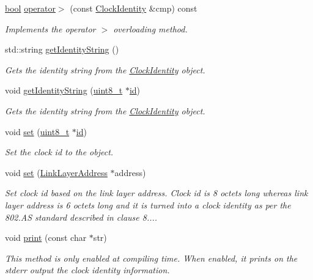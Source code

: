 \begin{DoxyCompactItemize}
\hyperlink{avb__gptp_8h_af6a258d8f3ee5206d682d799316314b1}{bool} \hyperlink{class_clock_identity_ae0b3cf69f8690ec06af628ca2caa7ada}{operator$>$} (const \hyperlink{class_clock_identity}{Clock\+Identity} \&cmp) const 
\begin{DoxyCompactList}\small\item\em Implements the operator \textquotesingle{}$>$\textquotesingle{} overloading method. \end{DoxyCompactList}\item 
std\+::string \hyperlink{class_clock_identity_a340cfc06879a22b087f117121c347b56}{get\+Identity\+String} ()
\begin{DoxyCompactList}\small\item\em Gets the identity string from the \hyperlink{class_clock_identity}{Clock\+Identity} object. \end{DoxyCompactList}\item 
void \hyperlink{class_clock_identity_a944c6cf067934cf2caed1e93c367a852}{get\+Identity\+String} (\hyperlink{stdint_8h_aba7bc1797add20fe3efdf37ced1182c5}{uint8\+\_\+t} $\ast$\hyperlink{class_clock_identity_a8898dbdfcac5107567fdbf4878c140f9}{id})
\begin{DoxyCompactList}\small\item\em Gets the identity string from the \hyperlink{class_clock_identity}{Clock\+Identity} object. \end{DoxyCompactList}\item 
void \hyperlink{class_clock_identity_ab72d8e8d5a8c02e4c3a3ddcb272e7f4c}{set} (\hyperlink{stdint_8h_aba7bc1797add20fe3efdf37ced1182c5}{uint8\+\_\+t} $\ast$\hyperlink{class_clock_identity_a8898dbdfcac5107567fdbf4878c140f9}{id})
\begin{DoxyCompactList}\small\item\em Set the clock id to the object. \end{DoxyCompactList}\item 
void \hyperlink{class_clock_identity_a14b3656115db0d8d40e3381ecdbc01e8}{set} (\hyperlink{class_link_layer_address}{Link\+Layer\+Address} $\ast$address)
\begin{DoxyCompactList}\small\item\em Set clock id based on the link layer address. Clock id is 8 octets long whereas link layer address is 6 octets long and it is turned into a clock identity as per the 802.\+AS standard described in clause 8.... \end{DoxyCompactList}\item 
void \hyperlink{class_clock_identity_a85d50a09cb925cd08d803c5a8fd01da7}{print} (const char $\ast$str)
\begin{DoxyCompactList}\small\item\em This method is only enabled at compiling time. When enabled, it prints on the stderr output the clock identity information. \end{DoxyCompactList}\end{DoxyCompactItemize}
